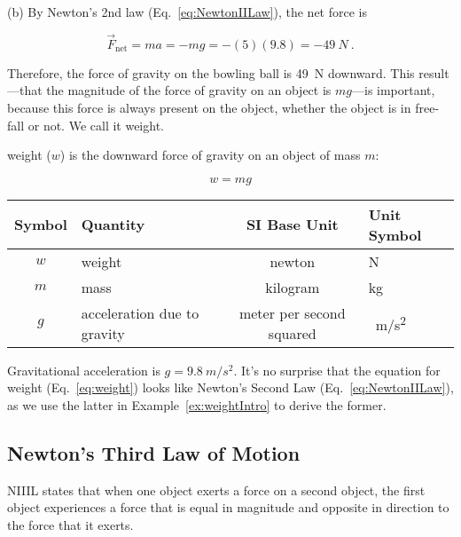 \documentclass[main.tex]{subfiles}
\begin{document}
(b) By Newton's 2nd law (Eq.~\ref{eq:NewtonIILaw}), the net force is

\begin{equation*}
    \vec{F}_{\text{net}} = m a = -m g = -(5)(9.8) = -\SI{49}{N}\ .
\end{equation*}

Therefore, the force of gravity on the bowling ball is \SI{49}{N} downward. This result---that the magnitude of the force of gravity on an object is $mg$---is important, because this force is always present on the object, whether the object is in free-fall or not. We call it weight.

\Gls{weight} ($w$) is the downward force of gravity on an object of mass $m$:

\begin{equation} \label{eq:weight} 
    w = mg
\end{equation}

\begin{center}
    \begin{tabular}{cl|cl}
    \hline
    \textbf{Symbol} & \textbf{Quantity} & \textbf{SI Base Unit} & \textbf{Unit Symbol}  \\
    \hline\hline
    \rule{0pt}{2.5ex}
        $w$ & weight & newton & N\\
        $m$ & mass & kilogram & kg\\
        $g$ & acceleration due to gravity & meter per second squared & \SI{}{m/s^2}\\
    \hline
    \end{tabular}
\end{center}

Gravitational acceleration is $g = \SI{9.8}{m/s^2}$. It's no surprise that the equation for weight (Eq.~\ref{eq:weight}) looks like Newton's Second Law (Eq.~\ref{eq:NewtonIILaw}), as we use the latter in Example~\ref{ex:weightIntro} to derive the former. 

\vspace{1em}

\cyanhrule

\subsection{Newton's Third Law of Motion} \label{N3R3iq}

\Gls{NIIIL} states that when one object exerts a force on a second object, the first object experiences a force that is equal in magnitude and opposite in direction to the force that it exerts.
\end{document}
